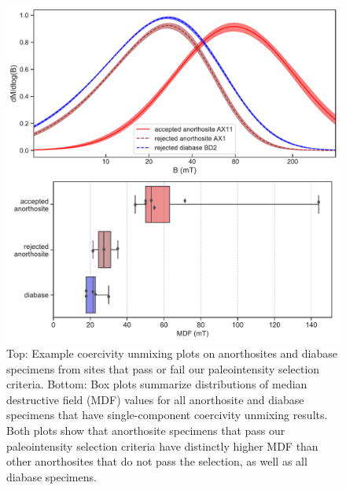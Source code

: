 \documentclass[9pt,twocolumn,twoside,lineno]{pnas-new}
\begin{document}
\begin{figure}[h!]
\noindent\includegraphics[width=\textwidth]{coercivity.pdf}
\centering
\caption{\footnotesize{Top: Example coercivity unmixing plots on anorthosites and diabase specimens from sites that pass or fail our paleointensity selection criteria. Bottom: Box plots summarize distributions of median destructive field (MDF) values for all anorthosite and diabase specimens that have single-component coercivity unmixing results. Both plots show that anorthosite specimens that pass our paleointensity selection criteria have distinctly higher MDF than other anorthosites that do not pass the selection, as well as all diabase specimens.}}
\label{fig:coercivity}
\end{figure}
\end{document}

